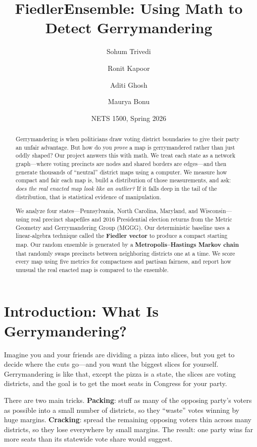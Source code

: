 \documentclass[11pt]{article}
\title{FiedlerEnsemble: Using Math to Detect Gerrymandering}
\author{Sohum Trivedi \and Ronit Kapoor \and Aditi Ghosh \and Maurya Bonu}
\date{NETS 1500, Spring 2026}
\begin{document}
\maketitle

\begin{abstract}
Gerrymandering is when politicians draw voting district boundaries to give
their party an unfair advantage. But how do you \emph{prove} a map is
gerrymandered rather than just oddly shaped? Our project answers this with
math. We treat each state as a network graph---where voting precincts are
nodes and shared borders are edges---and then generate thousands of
``neutral'' district maps using a computer. We measure how compact and
fair each map is, build a distribution of those measurements, and ask:
\emph{does the real enacted map look like an outlier?} If it falls deep
in the tail of the distribution, that is statistical evidence of
manipulation.

We analyze four states---Pennsylvania, North Carolina, Maryland, and
Wisconsin---using real precinct shapefiles and 2016 Presidential election
returns from the Metric Geometry and Gerrymandering Group (MGGG). Our
deterministic baseline uses a linear-algebra technique called the
\textbf{Fiedler vector} to produce a compact starting map. Our random
ensemble is generated by a \textbf{Metropolis--Hastings Markov chain}
that randomly swaps precincts between neighboring districts one at a
time. We score every map using five metrics for compactness and partisan
fairness, and report how unusual the real enacted map is compared to the
ensemble.
\end{abstract}

\section{Introduction: What Is Gerrymandering?}
\label{sec:intro}

Imagine you and your friends are dividing a pizza into slices, but you
get to decide where the cuts go---and you want the biggest slices for
yourself. Gerrymandering is like that, except the pizza is a state, the
slices are voting districts, and the goal is to get the most seats in
Congress for your party.

There are two main tricks. \textbf{Packing}: stuff as many of the
opposing party's voters as possible into a small number of districts,
so they ``waste'' votes winning by huge margins. \textbf{Cracking}:
spread the remaining opposing voters thin across many districts, so
they lose everywhere by small margins. The result: one party wins far
more seats than its statewide vote share would suggest.
\end{document}
